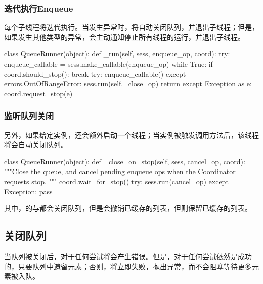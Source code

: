 \begin{content}
\subsubsection{迭代执行Enqueue}

每个子线程将迭代执行。当发生异常时，将自动关闭队列，并退出子线程；但是，如果发生其他类型的异常，会主动通知停止所有线程的运行，并退出子线程。

\begin{leftbar}
\begin{python}
class QueueRunner(object):
  def _run(self, sess, enqueue_op, coord):
    try:
      enqueue_callable = sess.make_callable(enqueue_op)
      while True:
        if coord.should_stop():
          break
        try:
          enqueue_callable()
        except errors.OutOfRangeError:  
          sess.run(self._close_op)
          return
    except Exception as e:
      coord.request_stop(e)
\end{python}
\end{leftbar}

\subsubsection{监听队列关闭}

另外，如果给定实例，还会额外启动一个线程；当实例被触发调用方法后，该线程将会自动关闭队列。

\begin{leftbar}
\begin{python}
class QueueRunner(object):
  def _close_on_stop(self, sess, cancel_op, coord):
    """Close the queue, and cancel pending enqueue ops
       when the Coordinator requests stop.
    """
    coord.wait_for_stop()
    try:
      sess.run(cancel_op)
    except Exception:
      pass
\end{python}
\end{leftbar}

其中，的与都会关闭队列，但是会撤销已缓存的列表，但则保留已缓存的列表。

\subsection{关闭队列}

当队列被关闭后，对于任何尝试将会产生错误。但是，对于任何尝试依然是成功的，只要队列中遗留元素；否则，将立即失败，抛出异常，而不会阻塞等待更多元素被入队。
\end{content}